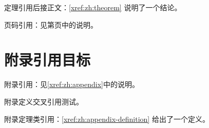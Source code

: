 \documentclass{uestcthesis}
\begin{document}
定理引用后接正文：\autoref{xref:zh:theorem} 说明了一个结论。

页码引用：见第\pageref{xref:zh:section}页中的说明。

\uestcappendix
\chapter{附录引用目标}\label{xref:zh:appendix}

附录引用：见\autoref{xref:zh:appendix}中的说明。

\begin{definition}\label{xref:zh:appendix-definition}
附录定义交叉引用测试。
\end{definition}

附录定理类引用：\autoref{xref:zh:appendix-definition} 给出了一个定义。
\end{document}
